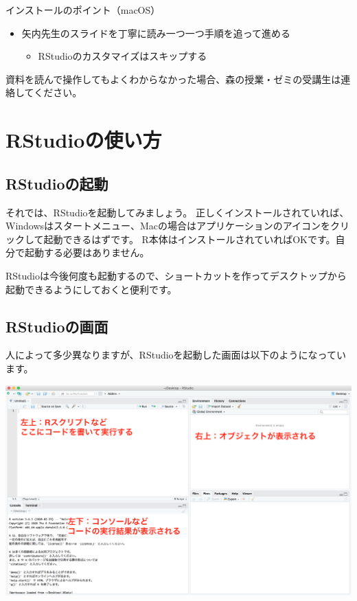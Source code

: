 \documentclass[
]{book}
\providecommand{\tightlist}{%
  \setlength{\itemsep}{0pt}\setlength{\parskip}{0pt}}
\begin{document}
インストールのポイント（macOS）

\begin{itemize}
\tightlist
\item
  矢内先生のスライドを丁寧に読み一つ一つ手順を追って進める

  \begin{itemize}
  \tightlist
  \item
    RStudioのカスタマイズはスキップする
  \end{itemize}
\end{itemize}

資料を読んで操作してもよくわからなかった場合、森の授業・ゼミの受講生は連絡してください。

\hypertarget{RStudio}{%
\chapter{RStudioの使い方}\label{RStudio}}

\hypertarget{rstudioux306eux8d77ux52d5}{%
\section{RStudioの起動}\label{rstudioux306eux8d77ux52d5}}

それでは、RStudioを起動してみましょう。
正しくインストールされていれば、Windowsはスタートメニュー、Macの場合はアプリケーションのアイコンをクリックして起動できるはずです。
R本体はインストールされていればOKです。自分で起動する必要はありません。

RStudioは今後何度も起動するので、ショートカットを作ってデスクトップから起動できるようにしておくと便利です。

\hypertarget{rstudioux306eux753bux9762}{%
\section{RStudioの画面}\label{rstudioux306eux753bux9762}}

人によって多少異なりますが、RStudioを起動した画面は以下のようになっています。

\begin{center}\includegraphics[width=0.7\linewidth]{image/RStudio_screen} \end{center}
\end{document}
